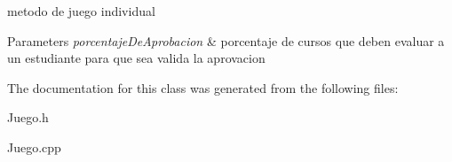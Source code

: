 metodo de juego individual 


\begin{DoxyParams}{Parameters}
{\em porcentaje\+De\+Aprobacion} & porcentaje de cursos que deben evaluar a un estudiante para que sea valida la aprovacion \\
\hline
\end{DoxyParams}


The documentation for this class was generated from the following files\+:\begin{DoxyCompactItemize}
\item 
Juego.\+h\item 
Juego.\+cpp\end{DoxyCompactItemize}
